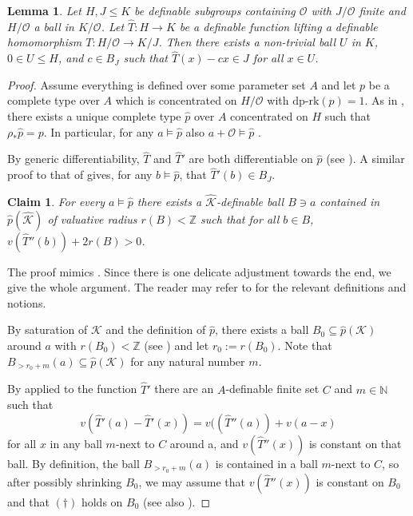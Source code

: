 \documentclass[11pt]{amsart}
\newtheorem{claim}{Claim}[theorem]
\newtheorem{lemma}[theorem]{Lemma}
\theoremstyle{definition}
\newcommand{\Nn}{{\mathbb{N}}}
\newcommand{\CK}{{\mathcal K}}
\newcommand{\CO}{{\mathcal O}}
\newcommand{\0}{\emptyset}
\def\dpr{\mathrm{dp\text{-}rk}}
\def\sub{\subseteq}
\newenvironment{claimproof}[1][\proofname]
  {%
    \proof[#1]%
      \renewcommand*\qedsymbol{$\square$ (claim)}%
  }
  {%
    \endproof%
  }
\begin{document}
	
	\begin{lemma}\label{L:locally scalar}
		Let $H,J\leq K$ be definable subgroups containing $\CO$ with $J/\CO$ finite and $H/\CO$ a ball in $K/\CO$. Let $\widehat T:H\to K$ be a definable function lifting a definable homomorphism $T:H/\CO\to K/J$. Then  there exists a non-trivial ball $U$ in $ K$, $0\in U\leq H$,  and $c\in B_J$ such that $\widehat T(x)-cx\in J$ for all $x\in U$.
	\end{lemma}
	\begin{proof}
		
		Assume everything is defined over some parameter set  $A$ and let $p$ be a complete type over $A$ which is concentrated on  $H/\CO$ with $\dpr(p)=1$. As in \cite[Section 3.2]{HaHaPeGps}, there exists a unique complete  type $\widehat p$ over $A$ concentrated on $H$ such that  $\rho_*\widehat p=p$.  In particular, for any $a\models \widehat p$ also   $a+\CO\models \widehat p$ .
		
		By generic differentiability,  $\widehat T$ and $\widehat T'$ are both  differentiable on $\widehat p$ (see \cite[Lemma 3.17(1)]{HaHaPeGps}). A similar proof to that of \cite[Lemma 3.17(2)]{HaHaPeGps} gives, for any $b\models \widehat p$, that  $\widehat T'(b)\in B_J$.
		
		
		
		
		\begin{claim}
			For every $a\models \widehat p$ there exists a $\widehat \CK$-definable ball $B\ni a$ contained in $\widehat p(\widehat \CK)$  of valuative radius $r(B)<\mathbb{Z}$  such that for all $b\in B$, $v(\widehat T''(b))+2r(B)>0$. 
		\end{claim}
		\begin{claimproof}
			The proof mimics \cite[Lemma 3.17(3)]{HaHaPeGps}. Since there is one delicate adjustment towards the end, we give the whole argument. The reader may refer to \cite[Section 3.2]{HaHaPeGps}  for the relevant definitions and notions. 
			
			By saturation of $\CK$ and the definition of $\widehat p$, there exists a ball $B_0\sub \widehat p(\CK)$ around $a$ with $r(B_0)< \mathbb{Z}$ (see \cite[Section 3.2]{HaHaPeGps}) and let $r_0:=r(B_0)$. Note that $B_{>r_0+m}(a)\subseteq \widehat p(\CK)$ for any natural number $m$. 
			
			By \cite[Fact 3.13]{HaHaPeGps} applied to the function $\widehat T'$ there are an $A$-definable finite set  $C$  and $m\in \Nn$  such that  \[\tag{$\dagger$}
			v(\widehat T'(a)-\widehat T'(x))=v((\widehat T''(a))+v(a-x)
			\]
			for all $x$ in any ball $m$-next to $C$ around a, and $v(\widehat T''(x))$ is constant on that ball.  
			By definition,  the ball $B_{> r_0+m}(a)$ is contained in a ball $m$-next to $C$, so after possibly shrinking $B_0$, we may assume that $v(\widehat T''(x))$ is constant on $B_0$ and that $(\dagger)$ holds on $B_0$ (see also \cite[Lemma 3.14]{HaHaPeGps}).
			

\end{claimproof}
\end{proof}
\end{document}
